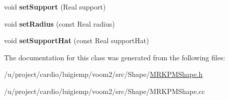 \begin{DoxyCompactItemize}
\item 
\hypertarget{classvoom_1_1_m_r_k_p_m_shape_a8d7c436956ceb482e6acb0564ead5c4e}{
void {\bfseries setSupport} (Real support)}
\label{classvoom_1_1_m_r_k_p_m_shape_a8d7c436956ceb482e6acb0564ead5c4e}

\item 
\hypertarget{classvoom_1_1_m_r_k_p_m_shape_a28903ffc3acf8e78dd5ec4120bd0f7f0}{
void {\bfseries setRadius} (const Real radius)}
\label{classvoom_1_1_m_r_k_p_m_shape_a28903ffc3acf8e78dd5ec4120bd0f7f0}

\item 
\hypertarget{classvoom_1_1_m_r_k_p_m_shape_ad74e97c387e08a728bdec1951eca92e1}{
void {\bfseries setSupportHat} (const Real supportHat)}
\label{classvoom_1_1_m_r_k_p_m_shape_ad74e97c387e08a728bdec1951eca92e1}

\end{DoxyCompactItemize}


The documentation for this class was generated from the following files:\begin{DoxyCompactItemize}
\item 
/u/project/cardio/luigiemp/voom2/src/Shape/\hyperlink{_m_r_k_p_m_shape_8h}{MRKPMShape.h}\item 
/u/project/cardio/luigiemp/voom2/src/Shape/MRKPMShape.cc\end{DoxyCompactItemize}
